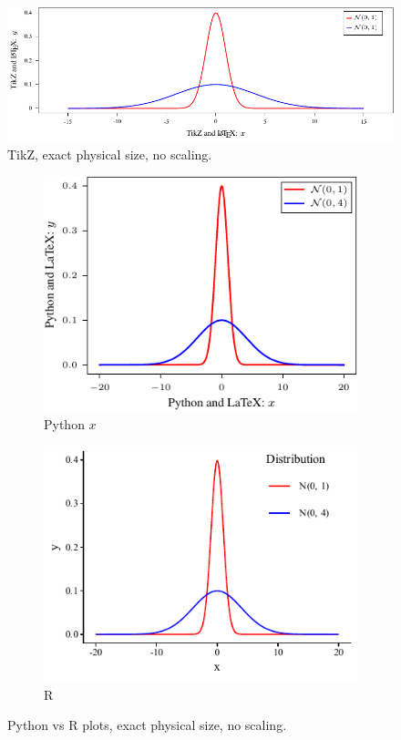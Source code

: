 \documentclass[aos,preprint]{imsart}
\begin{document}
\begin{figure}[htb]
	\centering
	\includegraphics{scatterplot-tikz.pdf}
	\caption{TikZ, exact physical size, no scaling.}
\end{figure}

\begin{figure}[htb]
	\centering
	\begin{subfigure}[t]{2.8in}
		\includegraphics{scatterplot-python.pdf}
		\caption{Python $x$}
	\end{subfigure}\hfill
	\begin{subfigure}[t]{2.8in}
		\includegraphics{scatterplot-R.pdf}
		\caption{R}
	\end{subfigure}

	\caption{Python vs R plots, exact physical size, no scaling.}
\end{figure}
\end{document}
